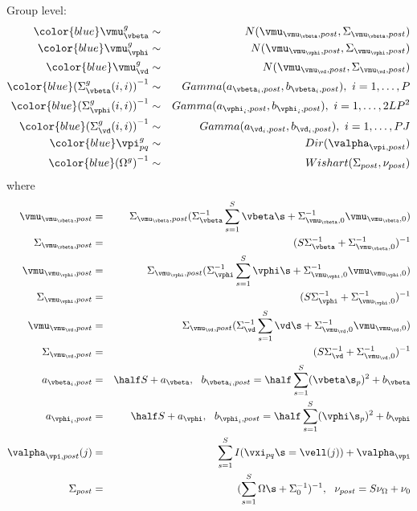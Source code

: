 Group level:
\begin{eqnarray}
\label{beta-group}
{\color{blue}\vmu_{\vbeta}^g} &\sim& N(\vmu_{\vmu_{\vbeta},post},\Sigma_{\vmu_{\vbeta},post})\\
\label{phi-group}
{\color{blue}\vmu_{\vphi}^g} &\sim& N(\vmu_{\vmu_{\vphi},post},\Sigma_{\vmu_{\vphi},post})\\
\label{d-group}
{\color{blue}\vmu_{\vd}^g} &\sim& N(\vmu_{\vmu_{\vd},post},\Sigma_{\vmu_{\vd},post})\\
\label{sigbeta-group}
{\color{blue}(\Sigma_{\vbeta}^g(i,i))}^{-1} &\sim& Gamma(a_{\vbeta_i,post},b_{\vbeta_i,post}), ~ i =1, \dots, P\\
\label{sigphi-group}
{\color{blue}(\Sigma_{\vphi}^g(i,i))}^{-1} &\sim& Gamma(a_{\vphi_i,post},b_{\vphi_i,post}),~ i =1, \dots, 2LP^2\\
{\color{blue}(\Sigma_{\vd}^g(i,i))}^{-1} &\sim& Gamma(a_{\vd_i,post},b_{\vd_i,post}),~ i =1, \dots, PJ\\
\label{pi-group}
{\color{blue}\vpi_{pq}^g} &\sim& Dir(\valpha_{\vpi,post})\\
\label{omega-group}
{\color{blue}(\Omega^{g})}^{-1} &\sim& Wishart(\Sigma_{post}, \nu_{post}) 
\end{eqnarray}
where
\begin{eqnarray}
\vmu_{\vmu_{\vbeta},post}&=& \Sigma_{\vmu_{\vbeta},post}(\Sigma_{\vbeta}^{-1}\sum_{s=1}^S \vbeta\s + \Sigma_{\vmu_{\vbeta},0}^{-1}\vmu_{\vmu_{\vbeta},0})\\
\Sigma_{\vmu_{\vbeta},post}&=& (S\Sigma_{\vbeta}^{-1} + \Sigma_{\vmu_{\vbeta},0}^{-1})^{-1}\\
\vmu_{\vmu_{\vphi},post}&=& \Sigma_{\vmu_{\vphi},post}(\Sigma_{\vphi}^{-1}\sum_{s=1}^S \vphi\s + \Sigma_{\vmu_{\vphi},0}^{-1}\vmu_{\vmu_{\vphi},0})\\
\Sigma_{\vmu_{\vphi},post}&=& (S\Sigma_{\vphi}^{-1} + \Sigma_{\vmu_{\vphi},0}^{-1})^{-1}\\
\vmu_{\vmu_{\vd},post}&=& \Sigma_{\vmu_{\vd},post}(\Sigma_{\vd}^{-1}\sum_{s=1}^S \vd\s + \Sigma_{\vmu_{\vd},0}^{-1}\vmu_{\vmu_{\vd},0})\\
\Sigma_{\vmu_{\vd},post}&=& (S\Sigma_{\vd}^{-1} + \Sigma_{\vmu_{\vd},0}^{-1})^{-1}\\
a_{\vbeta_i,post}&=&\half S + a_{\vbeta}, ~~
b_{\vbeta_i,post}= \half\sum_{s=1}^S (\vbeta\s_p)^2+ b_{\vbeta}\\
a_{\vphi_i,post}&=&\half S + a_{\vphi}, ~~
b_{\vphi_i,post}=\half\sum_{s=1}^S (\vphi\s_p)^2 + b_{\vphi}\\
\valpha_{\vpi,post}(j)&=& \sum_{s=1}^S I(\vxi_{pq}\s=\vell(j)) + \valpha_{\vpi}\\
\Sigma_{post} &=& (\sum_{s=1}^S \Omega\s + \Sigma_0^{-1})^{-1}, ~~
\nu_{post} = S\nu_{\Omega} + \nu_0
\end{eqnarray}


